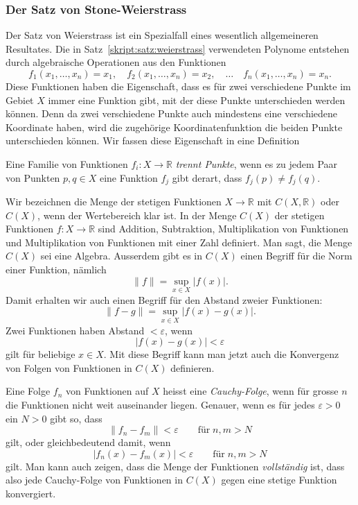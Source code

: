 \subsubsection{Der Satz von Stone-Weierstrass}
Der Satz von Weierstrass ist ein Spezialfall eines wesentlich allgemeineren
Resultates.
Die in Satz~\ref{skript:satz:weierstrass} verwendeten Polynome entstehen
durch algebraische Operationen aus den Funktionen
\[
f_1(x_1,\dots,x_n)=x_1,\quad
f_2(x_1,\dots,x_n)=x_2,\quad\dots\quad
f_n(x_1,\dots,x_n)=x_n.
\]
Diese Funktionen haben die Eigenschaft, dass es für zwei verschiedene
Punkte im Gebiet $X$ immer eine Funktion gibt, mit der diese Punkte
unterschieden werden können.
Denn da zwei verschiedene Punkte auch mindestens eine verschiedene
Koordinate haben, wird die zugehörige Koordinatenfunktion die beiden
Punkte unterschieden können.
Wir fassen diese Eigenschaft in eine Definition
\begin{definition}
Eine Familie von Funktionen $f_i\colon X\to \mathbb R$ {\em trennt Punkte},
wenn es zu jedem Paar von Punkten $p,q\in X$ eine Funktion $f_j$ gibt derart,
dass $f_j(p)\ne f_j(q)$.
\end{definition}
%

Wir bezeichnen die Menge der stetigen Funktionen $X\to\mathbb R$
mit $C(X,\mathbb R)$ oder $C(X)$, wenn der Wertebereich klar ist.
In der Menge $C(X)$ der stetigen Funktionen $f\colon X\to\mathbb R$ sind
Addition, Subtraktion, Multiplikation von Funktionen und Multiplikation
von Funktionen mit einer Zahl definiert.
Man sagt, die Menge $C(X)$ sei eine Algebra.
%
Ausserdem gibt es in $C(X)$ einen Begriff für die Norm einer Funktion,
nämlich
\begin{equation}
\| f\| = \sup_{x\in X}|f(x)|.
\label{skript:multipol:supremum-norm}
\end{equation}
%
Damit erhalten wir auch einen Begriff für den Abstand zweier Funktionen:
\[
\|f-g\| = \sup_{x\in X}|f(x)-g(x)|.
\]
Zwei Funktionen haben Abstand $< \varepsilon$, wenn
\[
|f(x)-g(x)| < \varepsilon
\]
gilt für beliebige $x\in X$.
Mit diese Begriff kann man jetzt auch die Konvergenz von Folgen von
Funktionen in $C(X)$ definieren.

Eine Folge $f_n$ von Funktionen auf $X$ heisst eine {\em Cauchy-Folge}, wenn 
%
für grosse $n$ die Funktionen nicht weit auseinander liegen.
Genauer, wenn es für jedes $\varepsilon>0$ ein $N>0$ gibt so, dass
\[
\|f_n-f_m\| < \varepsilon \qquad\text{für}\; n,m>N
\]
gilt, oder gleichbedeutend damit, wenn
\[
|f_n(x)-f_m(x)|<\varepsilon\qquad\text{für}\; n,m>N
\]
gilt.
Man kann auch zeigen, dass die Menge der Funktionen {\em vollständig} ist,
dass also jede Cauchy-Folge von Funktionen in $C(X)$ gegen eine stetige
Funktion konvergiert.
%

